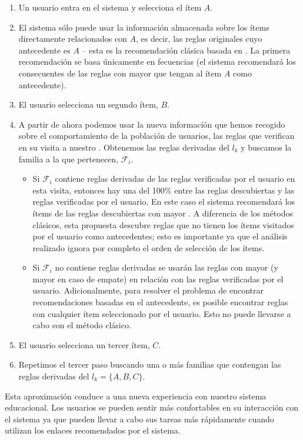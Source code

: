 \begin{enumerate}
  \item Un usuario entra en el sistema y selecciona el ítem $A$.
  \item El sistema sólo puede usar la información almacenada sobre los ítems directamente relacionados con $A$, es decir, las reglas originales cuyo antecedente es $A$ -- esta es la recomendación clásica basada en \ARs. La primera recomendación se basa únicamente en fecuencias (el sistema recomendará los consecuentes de las reglas con mayor \confianza que tengan al ítem $A$ como antecedente).
  \item El usuario selecciona un segundo ítem, $B$.
  \item A partir de ahora podemos usar la nueva información que hemos recogido sobre el comportamiento de la población de usuarios, las reglas que verifican en su visita a nuestro \portalWeb. Obtenemos las reglas derivadas del \kitemset $l_k$ y buscamos la familia a la que pertenecen, $\mathcal{F}_i$.
  \begin{itemize}
    \item Si $\mathcal{F}_i$ contiene reglas derivadas de las reglas verificadas por el usuario en esta visita, entonces hay una \confianza del 100\% entre las reglas descubiertas y las reglas verificadas por el usuario. En este caso el sistema recomendará los ítems de las reglas descubiertas con mayor \soporte. A diferencia de los métodos clásicos, esta propuesta descubre reglas que no tienen los ítems visitados por el usuario como antecedentes; esto es importante ya que el análisis realizado ignora por completo el orden de selección de los ítems.
    \item Si $\mathcal{F}_i$ no contiene reglas derivadas se usarán las reglas con mayor \confianza (y mayor \soporte en caso de empate) en relación con las reglas verificadas por el usuario. Adicionalmente, para resolver el problema de encontrar recomendaciones basadas en el antecedente, es posible encontrar reglas con cualquier ítem seleccionado por el usuario. Esto no puede llevarse a cabo con el método clásico.
  \end{itemize}
  \item El usuario selecciona un tercer ítem, $C$.
  \item Repetimos el tercer paso buscando una o más familias que contengan las reglas derivadas del \kitemset $l_k = \{A,B,C\}$.
\end{enumerate}

Esta aproximación conduce a una nueva experiencia con nuestro sistema educacional. Los usuarios se pueden sentir más confortables en su interacción con el sistema ya que pueden llevar a cabo sus tareas más rápidamente cuando utilizan los enlaces recomendados por el sistema.
